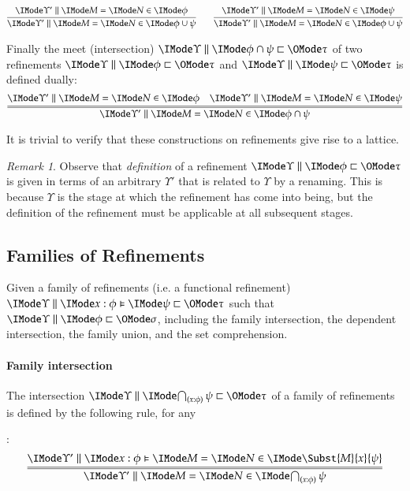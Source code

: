 \documentclass[11pt]{article}
\theoremstyle{definition}
\theoremstyle{notation}
\theoremstyle{remark}
\newtheorem{remark}[thm]{Remark}
\numberwithin{equation}{section}
\begin{document}
\begin{gather*}
  \infer{
    \RMemEq{\Upsilon'}{M}{N}{\phi\cup\psi}
  }{
    \RMemEq{\Upsilon'}{M}{N}{\phi}
  }\qquad
  \infer{
    \RMemEq{\Upsilon'}{M}{N}{\phi\cup\psi}
  }{
    \RMemEq{\Upsilon'}{M}{N}{\psi}
  }
\end{gather*}

Finally the meet (intersection) $\Refines{\Upsilon}{\phi\cap\psi}{\tau}$ of two refinements
$\Refines{\Upsilon}{\phi}{\tau}$ and $\Refines{\Upsilon}{\psi}{\tau}$ is defined
dually:
\[
  \infer={
    \RMemEq{\Upsilon'}{M}{N}{\phi\cap\psi}
  }{
    \RMemEq{\Upsilon'}{M}{N}{\phi} &
    \RMemEq{\Upsilon'}{M}{N}{\psi}
  }
\]

It is trivial to verify that these constructions on refinements give rise to a
lattice.

\begin{remark}
  Observe that \emph{definition} of a refinement
  $\Refines{\Upsilon}{\phi}{\tau}$ is given in terms of an arbitrary
  $\Upsilon'$ that is related to $\Upsilon$ by a renaming. This is because
  $\Upsilon$ is the stage at which the refinement has come into being, but the
  definition of the refinement must be applicable at all subsequent stages.
\end{remark}

\subsection{Families of Refinements}

Given a family of refinements (i.e. a functional refinement)
$\FRefines{\Upsilon}{x:\phi}{\psi}{\tau}$ such that
$\Refines{\Upsilon}{\phi}{\sigma}$, including the family intersection, the
dependent intersection, the family union, and the set comprehension.

\paragraph{Family intersection}
The intersection $\Refines{\Upsilon}{\bigcap_{(x:\phi)}\psi}{\tau}$ of a family
of refinements is defined by the following rule, for any
:
\[
  \infer={
    \RMemEq{\Upsilon'}{M}{N}{
      \bigcap_{(x:\phi)}\psi
    }
  }{
    \FRMemEq{\Upsilon'}{x:\phi}{M}{N}{\Subst{M}{x}{\psi}}
  }
\]
\end{document}
